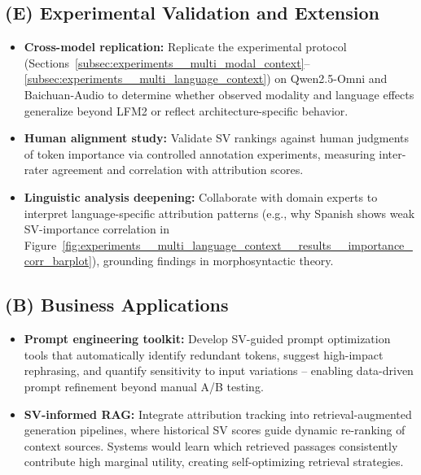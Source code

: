 \subsection*{(E) Experimental Validation and Extension}

\begin{itemize}
\item \textbf{Cross-model replication:}
Replicate the experimental protocol (Sections~\ref{subsec:experiments__multi_modal_context}--\ref{subsec:experiments__multi_language_context}) on Qwen2.5-Omni and Baichuan-Audio to determine whether observed modality and language effects generalize beyond LFM2 or reflect architecture-specific behavior.

\item \textbf{Human alignment study:}
Validate SV rankings against human judgments of token importance via controlled annotation experiments, measuring inter-rater agreement and correlation with attribution scores.

\item \textbf{Linguistic analysis deepening:}
Collaborate with domain experts to interpret language-specific attribution patterns (e.g., why Spanish shows weak SV-importance correlation in Figure~\ref{fig:experiments__multi_language_context__results__importance_corr_barplot}), grounding findings in morphosyntactic theory.
\end{itemize}

\subsection*{(B) Business Applications}

\begin{itemize}
\item \textbf{Prompt engineering toolkit:}
Develop SV-guided prompt optimization tools that automatically identify redundant tokens, suggest high-impact rephrasing, and quantify sensitivity to input variations -- enabling data-driven prompt refinement beyond manual A/B testing.

\item \textbf{SV-informed RAG:}
Integrate attribution tracking into retrieval-augmented generation pipelines, where historical SV scores guide dynamic re-ranking of context sources. Systems would learn which retrieved passages consistently contribute high marginal utility, creating self-optimizing retrieval strategies.
\end{itemize}

